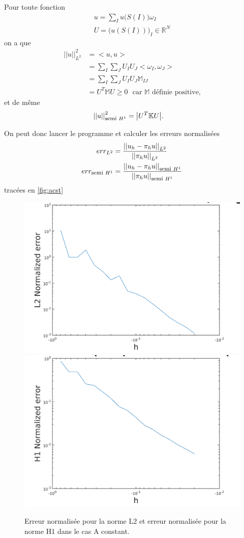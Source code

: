 \documentclass[11pt]{article}
\newcommand{\smbox}[1]{\mbox{\footnotesize #1}}
\newcommand{\R}{\mathbb{R}}
\newcommand{\K}{\mathbb{K}}
\newcommand{\M}{\mathbb{M}}
\newcommand{\ms}{~~~}
\newcommand{\norm}[1]{\left|\left|#1\right|\right|}
\begin{document}
Pour toute fonction
\begin{align}
  u = \sum_I u\big(S(I)\big) \omega_I \\
  U = \big(u(S(I))\big)_I \in \R^{ N}
\end{align}
on a que
\begin{align}
  \norm{u}_{L^2}^2 &= \big<u, u\big> \\
                   &= \sum_I \sum_J U_I U_J \big< \omega_I, \omega_J\big> \\
                   &= \sum_I \sum_J U_I U_J \M_{IJ} \\
                   &= U^T \M U \geq 0 \ms \mbox{car $\M$ définie positive,}
\end{align}
et de même
\begin{align}
  \norm{u}_{\smbox{semi~} H^1}^2 &= \big|U^T \K U \big|.
\end{align}

On peut donc lancer le programme et calculer les erreurs normalisées
\begin{align}
  err_{L^2} &= \frac{\norm{u_h-\pi_h u}_{L^2}}{\norm{\pi_h u}_{L^2}} \\
  err_{\smbox{semi~} H^1} &= \frac{\norm{u_h-\pi_h u}_{\smbox{semi~}H^1}}{\norm{\pi_h u}_{\smbox{semi~}H^1}} 
\end{align}
tracées en \autoref{fig:acst}


\begin{figure}
  \centering
  \includegraphics[width=.6\textwidth]{L2_Acst} \\
  \includegraphics[width=.6\textwidth]{H1_Acst}
  \caption{Erreur normalisée pour la norme L2 et erreur normalisée pour la norme H1 dans le cas A constant.}
  \label{fig:acst}
\end{figure}
\end{document}
